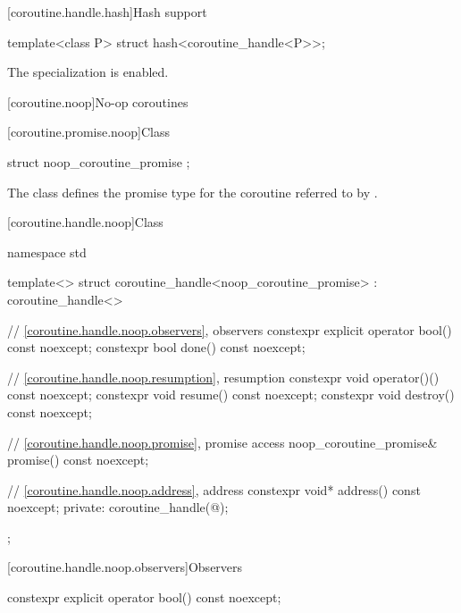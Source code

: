 [coroutine.handle.hash]{Hash support}

%
\begin{itemdecl}
template<class P> struct hash<coroutine_handle<P>>;
\end{itemdecl}

\begin{itemdescr}
\pnum The specialization is enabled.
\end{itemdescr}

[coroutine.noop]{No-op coroutines}

[coroutine.promise.noop]{Class }

%
\begin{itemdecl}
struct noop_coroutine_promise {};
\end{itemdecl}

\begin{itemdescr}
\pnum The class  defines the promise type for
the coroutine referred to
by .
\end{itemdescr}

[coroutine.handle.noop]{Class }

%
\begin{codeblock}
namespace std {
  template<>
  struct coroutine_handle<noop_coroutine_promise> : coroutine_handle<>
  {
    // \ref{coroutine.handle.noop.observers}, observers
    constexpr explicit operator bool() const noexcept;
    constexpr bool done() const noexcept;

    // \ref{coroutine.handle.noop.resumption}, resumption
    constexpr void operator()() const noexcept;
    constexpr void resume() const noexcept;
    constexpr void destroy() const noexcept;

    // \ref{coroutine.handle.noop.promise}, promise access
    noop_coroutine_promise& promise() const noexcept;

    // \ref{coroutine.handle.noop.address}, address
    constexpr void* address() const noexcept;
  private:
    coroutine_handle(@\unspec@);
  };
}
\end{codeblock}

[coroutine.handle.noop.observers]{Observers}

%
\begin{itemdecl}
constexpr explicit operator bool() const noexcept;
\end{itemdecl}

